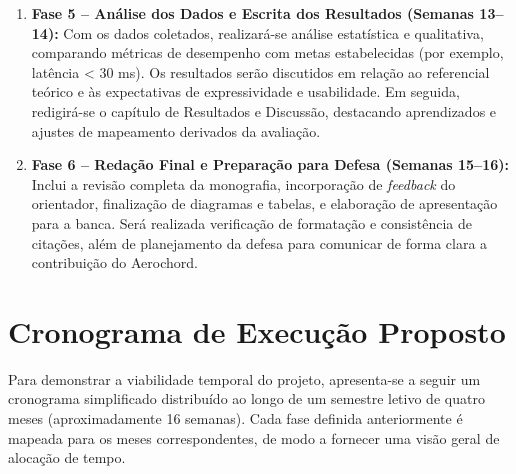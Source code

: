\begin{enumerate}
    \item \textbf{Fase 5 – Análise dos Dados e Escrita dos Resultados (Semanas 13–14):}
    Com os dados coletados, realizará-se análise estatística e qualitativa, comparando métricas de desempenho com metas estabelecidas (por exemplo, latência < 30 ms). Os resultados serão discutidos em relação ao referencial teórico e às expectativas de expressividade e usabilidade. Em seguida, redigirá-se o capítulo de Resultados e Discussão, destacando aprendizados e ajustes de mapeamento derivados da avaliação.
    \item \textbf{Fase 6 – Redação Final e Preparação para Defesa (Semanas 15–16):}
    Inclui a revisão completa da monografia, incorporação de \textit{feedback} do orientador, finalização de diagramas e tabelas, e elaboração de apresentação para a banca. Será realizada verificação de formatação e consistência de citações, além de planejamento da defesa para comunicar de forma clara a contribuição do Aerochord.
\end{enumerate}

\section{Cronograma de Execução Proposto}
\label{sec:cronograma}

Para demonstrar a viabilidade temporal do projeto, apresenta-se a seguir um cronograma simplificado distribuído ao longo de um semestre letivo de quatro meses (aproximadamente 16 semanas). Cada fase definida anteriormente é mapeada para os meses correspondentes, de modo a fornecer uma visão geral de alocação de tempo.

